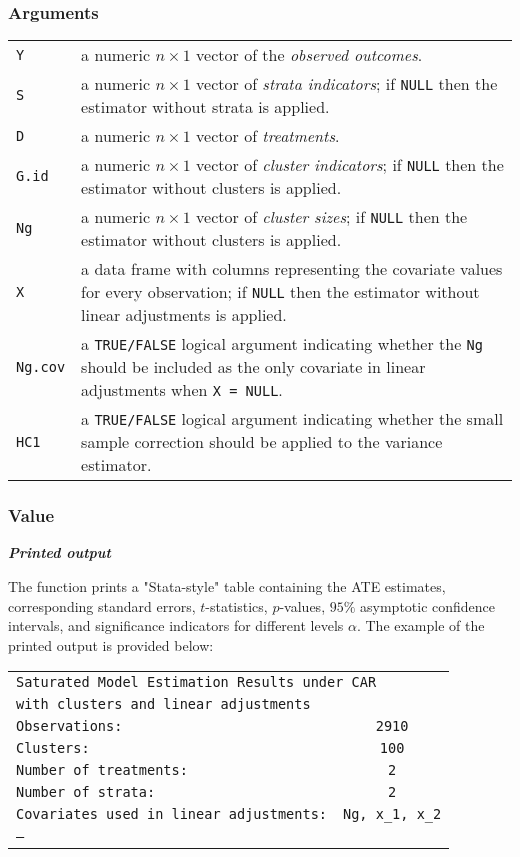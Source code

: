 \documentclass{article}
\makeatletter
\newenvironment{argdesc}{
    \par %
    \noindent %
    \normalfont %
    
    \begin{tabular}{@{}p{0.3\textwidth}p{0.6\textwidth}@{}} %
}{
    \end{tabular}
    \par %
   
}
\makeatother
\begin{document}
\subsubsection*{Arguments}
\begin{argdesc}
    \texttt{Y} & a numeric $n \times 1$ vector of the \textit{observed outcomes}. \\
    \texttt{S} & a numeric $n \times 1$ vector of \textit{strata indicators}; if \texttt{NULL} then the estimator without strata is applied. \\
    \texttt{D} & a numeric $n \times 1$ vector of \textit{treatments}. \\
    \texttt{G.id} & a numeric $n \times 1$ vector of \textit{cluster indicators}; if \texttt{NULL} then the estimator without clusters is applied. \\
    \texttt{Ng} & a numeric $n \times 1$ vector of \textit{cluster sizes}; if \texttt{NULL} then the estimator without clusters is applied. \\
    \texttt{X} & a data frame with columns representing the covariate values for every observation; if \texttt{NULL} then the estimator without linear adjustments is applied. \\
    \texttt{Ng.cov} & a \texttt{TRUE/FALSE} logical argument indicating whether the \texttt{Ng} should be included as the only covariate in linear adjustments when \texttt{X = NULL}. \\
    \texttt{HC1} & a \texttt{TRUE/FALSE} logical argument indicating whether the small sample correction should be applied to the variance estimator. \\
\end{argdesc}

\subsubsection*{Value}
\noindent \textit{\textbf{Printed output}}

The function prints a "Stata-style" table containing the ATE estimates, corresponding standard errors, $t$-statistics, $p$-values, $95\%$ asymptotic confidence intervals, and significance indicators for different levels $\alpha$. The example of the printed output is provided below:


\begin{flushleft}
\begin{tabular}{lc}
\multicolumn{2}{l}{\texttt{Saturated Model Estimation Results under CAR}} \\
\multicolumn{2}{l}{\texttt{with clusters and linear adjustments}} \\
\texttt{Observations:} & \texttt{2910} \\
\texttt{Clusters:} & \texttt{100} \\
\texttt{Number of treatments:} & \texttt{2} \\
\texttt{Number of strata:} & \texttt{2} \\
\texttt{Covariates used in linear adjustments:} & \texttt{Ng, x\_1, x\_2} \\
\texttt{---} \\
\end{tabular}
\end{flushleft}
\end{document}

